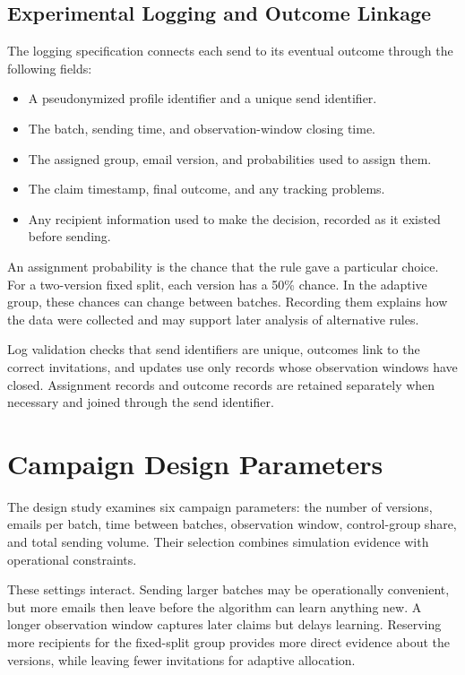 \subsection{Experimental Logging and Outcome Linkage}

The logging specification connects each send to its eventual outcome through the following fields:
\begin{itemize}
    \item A pseudonymized profile identifier and a unique send identifier.
    \item The batch, sending time, and observation-window closing time.
    \item The assigned group, email version, and probabilities used to assign them.
    \item The claim timestamp, final outcome, and any tracking problems.
    \item Any recipient information used to make the decision, recorded as it existed before sending.
\end{itemize}

An assignment probability is the chance that the rule gave a particular choice. For a two-version fixed split, each version has a 50\% chance. In the adaptive group, these chances can change between batches. Recording them explains how the data were collected and may support later analysis of alternative rules.

Log validation checks that send identifiers are unique, outcomes link to the correct invitations, and updates use only records whose observation windows have closed. Assignment records and outcome records are retained separately when necessary and joined through the send identifier.

\section{Campaign Design Parameters}
\label{sec:campaign_parameters}

The design study examines six campaign parameters: the number of versions, emails per batch, time between batches, observation window, control-group share, and total sending volume. Their selection combines simulation evidence with operational constraints.

These settings interact. Sending larger batches may be operationally convenient, but more emails then leave before the algorithm can learn anything new. A longer observation window captures later claims but delays learning. Reserving more recipients for the fixed-split group provides more direct evidence about the versions, while leaving fewer invitations for adaptive allocation.

